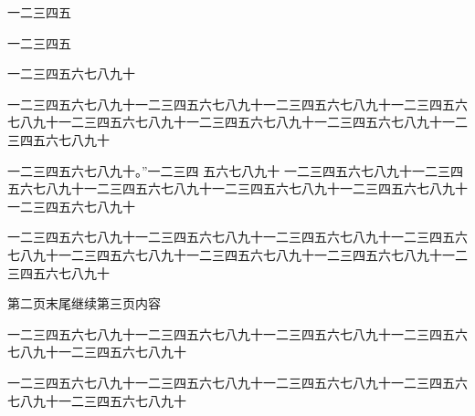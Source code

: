 \documentclass{ltc-guji}
\begin{document}
\begin{正文}
一二三四五

一二三四五

\begin{段落}[indent=2]
一二三四五六七八九十
\end{段落}

一二三四五六七八九十一二三四五六七八九十一二三四五六七八九十一二三四五六七八九十一二三四五六七八九十一二三四五六七八九十一二三四五六七八九十一二三四五六七八九十

一二三四五六七八九十。”一二三四
五六七八九十
一二三四五六七八九十一二三四五六七八九十一二三四五六七八九十一二三四五六七八九十一二三四五六七八九十一二三四五六七八九十

一二三四五六七八九十一二三四五六七八九十一二三四五六七八九十一二三四五六七八九十一二三四五六七八九十一二三四五六七八九十一二三四五六七八九十一二三四五六七八九十

第二页末尾继续第三页内容

一二三四五六七八九十一二三四五六七八九十一二三四五六七八九十一二三四五六七八九十一二三四五六七八九十

一二三四五六七八九十一二三四五六七八九十一二三四五六七八九十一二三四五六七八九十一二三四五六七八九十

\end{正文}
\end{document}

